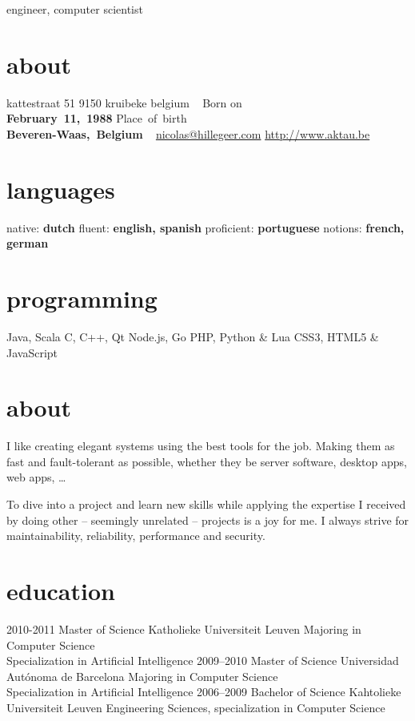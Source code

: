 \documentclass[]{friggeri-cv}
\begin{document}
       {engineer, computer scientist}

\begin{aside}
  \section{about}
    kattestraat 51
    9150 kruibeke
    belgium
    ~
    Born on\\\textbf{February~11,~1988}
    Place~of~birth\\\textbf{Beveren-Waas,~Belgium}
    ~
    \href{mailto:nicolas@hillegeer.com}{nicolas@hillegeer.com}
    \href{http://www.aktau.be}{http://www.aktau.be}
  \section{languages}
    native: \textbf{dutch}
    fluent: \textbf{english, spanish}
    proficient: \textbf{portuguese}
    notions: \textbf{french, german}
  \section{programming}
    Java, Scala
    C, C++, Qt
    Node.js, Go
    PHP, Python \& Lua
    CSS3, HTML5 \& JavaScript
\end{aside}

\section{about}

I like creating elegant systems using the best tools for the job. Making them as fast and fault-tolerant as possible,
whether they be server software, desktop apps, web apps, \ldots

To dive into a project and learn new skills while applying the expertise I received by doing other -- seemingly unrelated -- projects
is a joy for me. I always strive for maintainability, reliability, performance and security.

\section{education}

\begin{entrylist}
  \entry
    {2010-2011}
    {Master of Science}
    {Katholieke Universiteit Leuven}
    {Majoring in Computer Science\\
    Specialization in Artificial Intelligence}
  \entry
    {2009–2010}
    {Master of Science}
    {Universidad Autónoma de Barcelona}
    {Majoring in Computer Science\\
    Specialization in Artificial Intelligence}
  \entry
    {2006–2009}
    {Bachelor of Science}
    {Kahtolieke Universiteit Leuven}
    {Engineering Sciences, specialization in Computer Science}
\end{entrylist}
\end{document}
